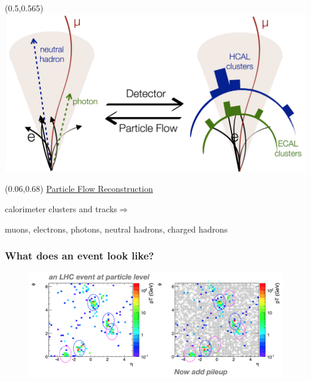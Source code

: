 \begin{frame}[t]
\begin{textblock}{0.55}
	\end{textblock}
	\begin{textblock}{0.5}(0.5,0.565)
		\includegraphics[width=\textwidth]{images/pileup_mitigation/PFAlgo.png}
	\end{textblock}
	\begin{textblock}{0.4}(0.06,0.68)
		\centering
		\ul{Particle Flow Reconstruction}
		\vspace*{0.2cm}

		{\color{maroon}
		calorimeter clusters and tracks$\Rightarrow$
		\vspace*{0.2cm}

		muons, electrons, photons, neutral hadrons, charged hadrons}
	\end{textblock}
\end{frame}

\begin{frame}[t]\frametitle{What does an event look like?}
	\vspace*{0.25cm}
	\begin{figure}[tb]
		\centering
		\includegraphics[width=\textwidth]{images/pileup_mitigation/LHC_event_particle_level.png}
	\end{figure}
\end{frame}

